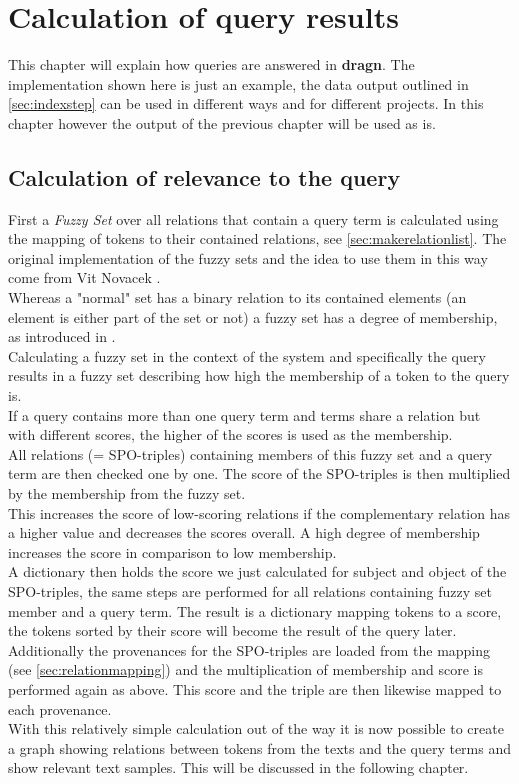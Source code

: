 \section{Calculation of query results}
\label{sec:querystep}
This chapter will explain how queries are answered in \textbf{dragn}. The implementation shown here is just an example, the data output outlined in \ref{sec:indexstep} can be used in different ways and for different projects. In this chapter however the output of the previous chapter will be used as is. \\

\subsection{Calculation of relevance to the query}
\label{sec:popdict}
First a \textit{Fuzzy Set} over all relations that contain a query term is calculated using the mapping of tokens to their contained relations, see \ref{sec:makerelationlist}. The original implementation of the fuzzy sets and the idea to use them in this way come from Vit Novacek \cite{novavcek2014skimmr}.\\
Whereas a "normal" set has a binary relation to its contained elements (an element is either part of the set or not) a fuzzy set has a degree of membership, as introduced in \cite{zadeh1965fuzzy}.\\
Calculating a fuzzy set in the context of the system and specifically the query results in a fuzzy set describing how high the membership of a token to the query is.\\
If a query contains more than one query term and terms share a relation but with different scores, the higher of the scores is used as the membership.\\
All relations (= SPO-triples) containing members of this fuzzy set and a query term are then checked one by one. The score of the SPO-triples is then multiplied by the membership from the fuzzy set.\\
This increases the score of low-scoring relations if the complementary relation has a higher value and decreases the scores overall. A high degree of membership increases the score in comparison to low membership.\\
A dictionary then holds the score we just calculated for subject and object of the SPO-triples, the same steps are performed for all relations containing fuzzy set member and a query term. The result is a dictionary mapping tokens to a score, the tokens sorted by their score will become the result of the query later.\\
Additionally the provenances for the SPO-triples are loaded from the mapping (see \ref{sec:relationmapping}) and the multiplication of membership and score is performed again as above. This score and the triple are then likewise mapped to each provenance.\\
With this relatively simple calculation out of the way it is now possible to create a graph showing relations between tokens from the texts and the query terms and show relevant text samples. This will be discussed in the following chapter.

